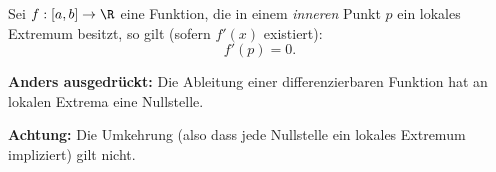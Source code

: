 Sei $f: [a, b] \to \R$ eine Funktion, die in einem \textit{inneren} Punkt $p$ ein lokales Extremum besitzt, so gilt (sofern $f'(x)$ existiert):
$$f'(p) = 0.$$

\textbf{Anders ausgedrückt:} Die Ableitung einer differenzierbaren Funktion hat an lokalen Extrema eine Nullstelle.

\textbf{Achtung:} Die Umkehrung (also dass jede Nullstelle ein lokales Extremum impliziert) gilt nicht.